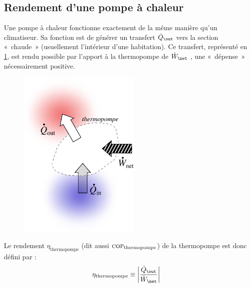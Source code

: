 	\subsection{Rendement d’une pompe à chaleur}
	\label{ch_rendement_thermopompe}

		Une pompe à chaleur fonctionne exactement de la même manière qu’un climatiseur. Sa fonction est de générer un transfert $\dot Q_\out$ vers la section «~chaude~» (usuellement l’intérieur d’une habitation). Ce transfert, représenté en \cref{fig_transferts_thermopompe}, est rendu possible par l’apport à la thermopompe de $\dot W_\net$ , une «~dépense~» nécessairement positive.

		\begin{figure}
			\begin{center}
				\vspace{-0.5cm}
				\includegraphics[width=6cm]{images/efficacite_thermopompe.png}
				\vspace{-1cm}
			\end{center}
			\label{fig_transferts_thermopompe}
		\end{figure}

		Le rendement $\eta_\text{thermopompe}$ (dit aussi $\textsc{cop}_\text{thermopompe}$) de la thermopompe est donc défini par :
		\begin{equation}
			\eta_\text{thermopompe} \equiv \left| \frac{\dot Q_\out}{\dot W_\net} \right|
			\label{def_rendement_thermopompe}
		\end{equation}
	

